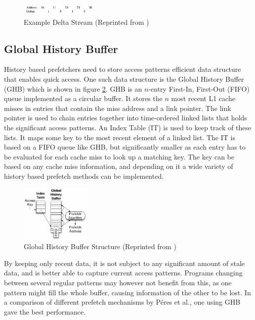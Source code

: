 \documentclass[a4paper]{IEEEtran}
\begin{document}
\begin{figure}[!ht]
  \centering
      \includegraphics[width=0.35\textwidth]{Figures/DCExample}
  \caption{Example Delta Stream (Reprinted from \protect\cite{dcpt})}
  \label{fig:delta_stream}
\end{figure}

\subsection{Global History Buffer}

History based prefetchers need to store access patterns efficient data structure that enables quick access.
One such data structure is the Global History Buffer (GHB) \cite{ghb} which is shown in figure \ref{fig:ghb}.
GHB is an $n$-entry First-In, First-Out (FIFO) queue implemented as a circular buffer.
It stores the $n$ most recent L1 cache misses in entries that contain the miss address and a link pointer.
The link pointer is used to chain entries together into time-ordered linked lists that holds the significant access patterns.
An Index Table (IT) is used to keep track of these lists.
It maps some key to the most recent element of a linked list.
The IT is based on a FIFO queue like GHB, but significantly smaller as each entry has to be evaluated for each cache miss to look up a matching key.
The key can be based on any cache miss information, and depending on it a wide variety of history based prefetch methods can be implemented.

\begin{figure}[!ht]
  \centering
      \includegraphics[width=0.3\textwidth]{Figures/ghb}
  \caption{Global History Buffer Structure (Reprinted from )}
  \label{fig:ghb}
\end{figure}

By keeping only recent data, it is not subject to any significant amount of stale data, and is better able to capture current access patterns.
Programs changing between several regular patterns may however not benefit from this, as one pattern might fill the whole buffer, causing information of the other to be lost.
In a comparison of different prefetch mechanisms by Péres et al.\cite{microlib}, one using GHB gave the best performance.
\end{document}
